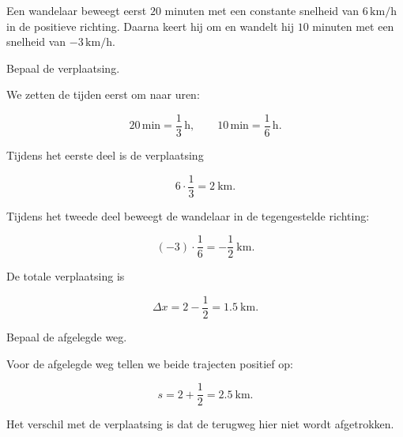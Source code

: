 \documentclass{ximera}
\begin{document}
\begin{oefening}{\oefU\ESS}

Een wandelaar beweegt eerst \(20\) minuten met een constante snelheid
van \(6\,\mathrm{km/h}\) in de positieve richting. Daarna keert hij om
en wandelt hij \(10\) minuten met een snelheid van
\(-3\,\mathrm{km/h}\).

\begin{question}
Bepaal de verplaatsing.

\begin{oplossing}

We zetten de tijden eerst om naar uren:

\[
20\,\mathrm{min}=\frac13\,\mathrm h,
\qquad
10\,\mathrm{min}=\frac16\,\mathrm h.
\]

Tijdens het eerste deel is de verplaatsing

\[
6\cdot\frac13=2\ \mathrm{km}.
\]

Tijdens het tweede deel beweegt de wandelaar in de tegengestelde
richting:

\[
(-3)\cdot\frac16=-\frac12\ \mathrm{km}.
\]

De totale verplaatsing is

\[
\Delta x
=
2-\frac12
=
\boxed{1.5\ \mathrm{km}}.
\]

\end{oplossing}
\end{question}

\begin{question}
Bepaal de afgelegde weg.

\begin{oplossing}

Voor de afgelegde weg tellen we beide trajecten positief op:

\[
s
=
2+\frac12
=
\boxed{2.5\ \mathrm{km}}.
\]

Het verschil met de verplaatsing is dat de terugweg hier niet wordt
afgetrokken.

\end{oplossing}
\end{question}

\end{oefening}


\end{document}
